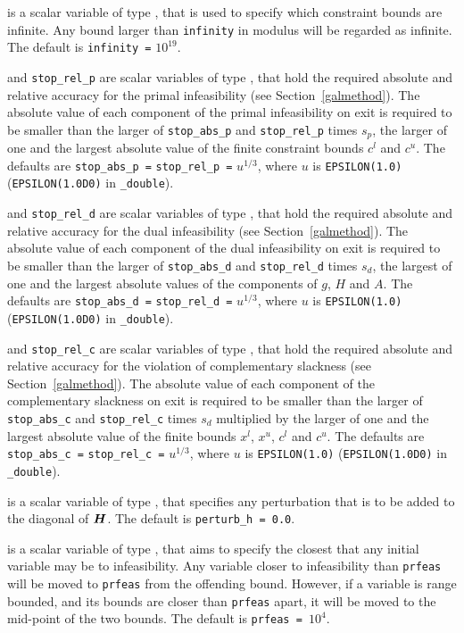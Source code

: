 \begin{description}
 is a scalar variable of type \realdp, that is used to
specify which constraint bounds are infinite.
Any bound larger than {\tt infinity} in modulus will be regarded as infinite.
The default is {\tt infinity =} $10^{19}$.

 and {\tt stop\_rel\_p}
are scalar variables of type \realdp, that hold the
required absolute and relative accuracy for the primal infeasibility
(see Section~\ref{galmethod}).
The absolute value of each component of the primal infeasibility
on exit is required to be smaller than the larger of {\tt stop\_abs\_p} and
{\tt stop\_rel\_p} times $s_p$, the larger of one and the largest
absolute value of the finite constraint bounds $c^l$ and $c^u$.
The defaults are {\tt stop\_abs\_p =} {\tt stop\_rel\_p =} $u^{1/3}$,
where $u$ is {\tt EPSILON(1.0)} ({\tt EPSILON(1.0D0)} in
{\tt \fullpackagename\_double}).

 and {\tt stop\_rel\_d}
are scalar variables of type \realdp, that hold the
required absolute and relative accuracy for the dual infeasibility
(see Section~\ref{galmethod}).
The absolute value of each component of the dual infeasibility
on exit is required to be smaller than the larger of {\tt stop\_abs\_d} and
{\tt stop\_rel\_d} times $s_d$, the largest of one and the largest
absolute values of the components of $g$, $H$ and $A$.
The defaults are {\tt stop\_abs\_d =} {\tt stop\_rel\_d =} $u^{1/3}$,
where $u$ is {\tt EPSILON(1.0)} ({\tt EPSILON(1.0D0)} in
{\tt \fullpackagename\_double}).

 and {\tt stop\_rel\_c}
are scalar variables of type \realdp, that hold the
required absolute and relative accuracy
for the violation of complementary slackness
(see Section~\ref{galmethod}).
The absolute value of each component of the complementary slackness
on exit is required to be smaller than the larger of {\tt stop\_abs\_c} and
{\tt stop\_rel\_c} times $s_d$ multiplied by the larger of one and the
largest absolute value of the finite bounds $x^l$, $x^u$, $c^l$ and $c^u$.
The defaults are {\tt stop\_abs\_c =} {\tt stop\_rel\_c =} $u^{1/3}$,
where $u$ is {\tt EPSILON(1.0)} ({\tt EPSILON(1.0D0)} in
{\tt \fullpackagename\_double}).

 is a scalar variable of type \realdp, that specifies
any perturbation that is to be added to the diagonal of ${\bm{H}}$.
The default is {\tt perturb\_h = 0.0}.

 is a scalar variable of type \realdp, that aims to specify
the closest that any initial variable may be to infeasibility. Any variable
closer to infeasibility than {\tt prfeas} will be moved to {\tt prfeas} from
the offending bound. However, if a variable is range bounded, and its bounds
are closer than {\tt prfeas} apart, it will be moved to the mid-point of the
two bounds.
The default is {\tt prfeas = $10^4$}.


\end{description}
